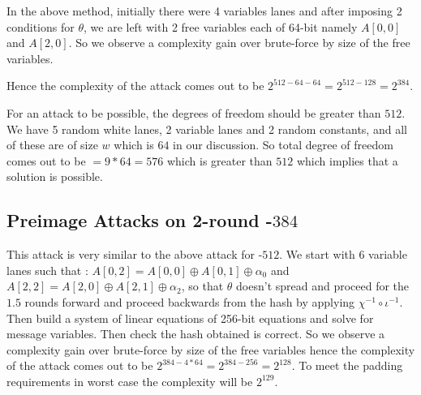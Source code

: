 		In the above method, initially there were 4 variables lanes and after imposing 2 conditions for $\theta$, we are left with 2 free variables each of 64-bit namely $A[0,0]$ and $A[2, 0]$. So we observe a complexity gain over brute-force by size of the free variables.
		
		Hence the complexity of the attack comes out to be $2^{512 - 64 - 64} = 2^{512 - 128} = 2^{384}$.

		For an attack to be possible, the degrees of freedom should be greater than $512$. We have 5 random white lanes, 2 variable lanes and 2 random constants, and all of these are of size $w$ which is $64$ in our discussion. So total degree of freedom comes out to be $= 9 * 64 = 576$ which is greater than $512$ which implies that a solution is possible.

\subsection{Preimage Attacks on 2-round \KECCAK-$384$}
	This attack is very similar to the above attack for \KECCAK-$512$. We start with 6 variable lanes such that :
	$A[0, 2] = A[0, 0] \oplus A[0, 1] \oplus \alpha_0$ and $A[2, 2] = A[2, 0] \oplus A[2, 1] \oplus \alpha_2$, so that $\theta$ doesn't spread and proceed for the $1.5$ rounds forward and proceed backwards from the hash by applying $\chi^{-1} \circ \iota^{-1}$. Then build a system of linear equations of 256-bit equations and solve for message variables. Then check the hash obtained is correct. So we observe a complexity gain over brute-force by size of the free variables hence the complexity of the attack comes out to be $2^{384 - 4*64} = 2^{384 - 256} = 2^{128}$. To meet the padding requirements in worst case the complexity will be $2^{129}$.

